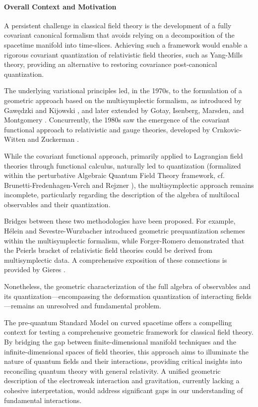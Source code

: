 \documentclass[a4paper]{article}
\begin{document}
\paragraph{Overall Context and Motivation}

A persistent challenge in classical field theory is the development of a fully covariant canonical formalism that avoids relying on a decomposition of the spacetime manifold into time-slices. Achieving such a framework would enable a rigorous covariant quantization of relativistic field theories, such as Yang-Mills theory, providing an alternative to restoring covariance post-canonical quantization.

The underlying variational principles led, in the 1970s, to the formulation of a geometric approach based on the multisymplectic formalism, as introduced by Gaw\k{e}dzki \cite{Gawedzki-1972} and Kijowski \cite{Kijowski-1973}, and later extended by Gotay, Isenberg, Marsden, and Montgomery \cite{Gotay-1991, Gimmsy1}. Concurrently, the 1980s saw the emergence of the covariant functional approach to relativistic and gauge theories, developed by Crnkovic-Witten \cite{Crnkovic-Witten:1987} and Zuckerman \cite{Zuckerman:1987}.

While the covariant functional approach, primarily applied to Lagrangian field theories through functional calculus, naturally led to quantization (formalized within the perturbative Algebraic Quantum Field Theory framework, cf. Brunetti-Fredenhagen-Verch \cite{Brunetti-Fredenhagen-Verch-2003} and Rejzner \cite{Rejzner-2016}), the multisymplectic approach remains incomplete, particularly regarding the description of the algebra of multilocal observables and their quantization.

Bridges between these two methodologies have been proposed. For example, Hélein \cite{Helein:2011} and Sevestre-Wurzbacher \cite{Sevestre2021} introduced geometric prequantization schemes within the multisymplectic formalism, while Forger-Romero \cite{Forger2005} demonstrated that the Peierls bracket of relativistic field theories could be derived from multisymplectic data. A comprehensive exposition of these connections is provided by Gieres \cite{Gieres:2021}.

Nonetheless, the geometric characterization of the full algebra of observables and its quantization—encompassing the deformation quantization of interacting fields—remains an unresolved and fundamental problem.

The pre-quantum Standard Model on curved spacetime offers a compelling context for testing a comprehensive geometric framework for classical field theory. By bridging the gap between finite-dimensional manifold techniques and the infinite-dimensional spaces of field theories, this approach aims to illuminate the nature of quantum fields and their interactions, providing critical insights into reconciling quantum theory with general relativity. A unified geometric description of the electroweak interaction and gravitation, currently lacking a cohesive interpretation, would address significant gaps in our understanding of fundamental interactions.
\end{document}
